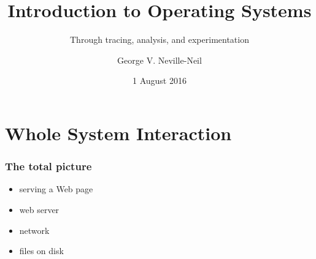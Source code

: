 
{
}

\usepackage[english]{babel}
\usepackage[latin1]{inputenc}
\usepackage{graphicx}
\usepackage{times}
\usepackage[T1]{fontenc}
\usepackage{fancyvrb}
\usepackage{listings}


\title{Introduction to Operating Systems}
\subtitle{Through tracing, analysis, and experimentation}
\author{George V. Neville-Neil}
\date{1 August 2016}

\begin{frame}
  \titlepage
\end{frame}

\section{Whole System Interaction}
\label{sec:whole}

\begin{frame}
  \frametitle{The total picture}
  \begin{itemize}
  \item serving a Web page
  \item web server
  \item network 
  \item files on disk
  \end{itemize}
\end{frame}



